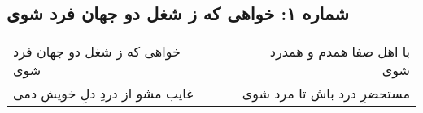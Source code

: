 \begin{center}
\section*{شماره ۱: خواهی که ز شغل دو جهان فرد شوی}
\label{sec:001}
\begin{longtable}{l p{0.5cm} r}
خواهی که ز شغل دو جهان فرد شوی
&&
با اهل صفا همدم و همدرد شوی
\\
غایب مشو از دردِ دلِ خویش دمی
&&
مستحضرِ درد باش تا مرد شوی
\\
\end{longtable}
\end{center}

